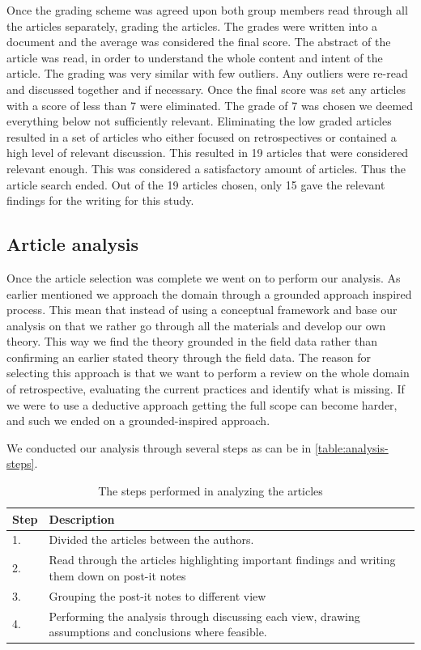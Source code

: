 \documentclass[12pt]{article}
\begin{document}
Once the grading scheme was agreed upon both group members read through all the articles separately, grading the articles. The grades were written into a document and the average was considered the final score. The abstract of the article was read, in order to understand the whole content and intent of the article. The grading was very similar with few outliers. Any outliers were re-read and discussed together and if necessary. Once the final score was set any articles with a score of less than 7 were eliminated. The grade of 7 was chosen we deemed everything below not sufficiently relevant. Eliminating the low graded articles resulted in a set of articles who either focused on retrospectives or contained a high level of relevant discussion. This resulted in 19 articles that were considered relevant enough. This was considered a satisfactory amount of articles. Thus the article search ended. Out of the 19 articles chosen, only 15 gave the relevant findings for the writing for this study. 

\subsection{Article analysis}
Once the article selection was complete we went on to perform our analysis. As earlier mentioned we approach the domain through a grounded approach inspired process. This mean that instead of using a conceptual framework and base our analysis on that we rather go through all the materials and develop our own theory. This way we find the theory grounded in the field data rather than confirming an earlier stated theory through the field data. The reason for selecting this approach is that we want to perform a review on the whole domain of retrospective, evaluating the current practices and identify what is missing. If we were to use a deductive approach getting the full scope can become harder, and such we ended on a grounded-inspired approach. 

We conducted our analysis through several steps as can be in \autoref{table:analysis-steps}. 


\begin{table}[!h]
	\centering
	\caption{The steps performed in analyzing the articles}
	\label{table:analysis-steps}
	\label{figure:survey}
	\begin{tabular}{l p{}}
		\hline
		Step & Description \\
		\hline
		1. & Divided the articles between the authors. \\
		2. & Read through the articles highlighting important findings and writing them down on post-it notes\\
		3. & Grouping the post-it notes to different view \\
		4. & Performing the analysis through discussing each view, drawing assumptions and conclusions where feasible. \\
		\hline
	\end{tabular}
\end{table}	
\end{document}
